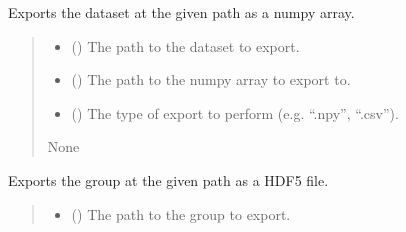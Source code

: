 \documentclass[letterpaper,10pt,english]{sphinxmanual}
\begin{document}
\begin{fulllineitems}
\begin{fulllineitems}
\label{\detokenize{source/HDF5_BLS:HDF5_BLS.wrapper.Wrapper.export_dataset}}
\pysigstartsignatures
\pysiglinewithargsret
{}
{\sphinxparamcomma {}\sphinxparamcomma {}}
{}
\pysigstopsignatures
\sphinxAtStartPar
Exports the dataset at the given path as a numpy array.
\begin{quote}\begin{description}
\begin{itemize}
\item {} 
\sphinxAtStartPar
{} () \textendash{} The path to the dataset to export.

\item {} 
\sphinxAtStartPar
{} () \textendash{} The path to the numpy array to export to.

\item {} 
\sphinxAtStartPar
{} () \textendash{} The type of export to perform (e.g. “.npy”, “.csv”).

\end{itemize}

\sphinxAtStartPar
None

\end{description}\end{quote}

\end{fulllineitems}


\begin{fulllineitems}
\label{\detokenize{source/HDF5_BLS:HDF5_BLS.wrapper.Wrapper.export_group}}
\pysigstartsignatures
\pysiglinewithargsret
{}
{\sphinxparamcomma {}}
{}
\pysigstopsignatures
\sphinxAtStartPar
Exports the group at the given path as a HDF5 file.
\begin{quote}\begin{description}
\begin{itemize}
\item {} 
\sphinxAtStartPar
{} () \textendash{} The path to the group to export.


\end{itemize}
\end{description}
\end{quote}
\end{fulllineitems}
\end{fulllineitems}
\end{document}
